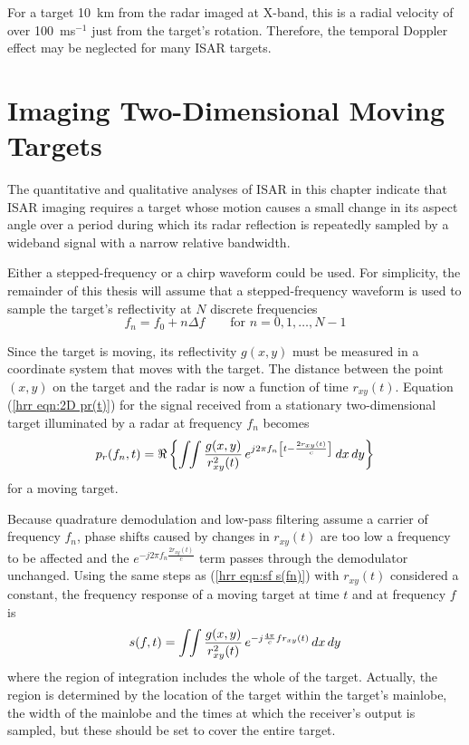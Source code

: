 For a target 10~km from the radar imaged at X-band, this is a radial
velocity of over 100~ms${}^{-1}$ just from the target's rotation.
Therefore, the temporal Doppler effect may be neglected for many ISAR
targets.

\section{Imaging Two-Dimensional Moving Targets}

The quantitative and qualitative analyses of ISAR in this chapter indicate
that ISAR imaging requires a target whose motion causes a small change in its
aspect angle over a period during which its radar reflection is repeatedly
sampled by a wideband signal with a narrow relative bandwidth.

Either a stepped-frequency or a chirp waveform could be used.  For
simplicity, the remainder of this thesis will assume that a
stepped-frequency waveform is used to sample the target's reflectivity at
$N$ discrete frequencies
\begin{equation}
f_n=f_0+n\Delta f\qquad\mbox{for $n=0,1,\ldots,N-1$}
\end{equation}

Since the target is moving, its reflectivity $g(x,y)$ must be measured
in a coordinate system that moves with the target.  The distance between the
point $(x,y)$ on the target and the radar is now a function of time
$r_{xy}(t)$.  Equation (\ref{hrr eqn:2D pr(t)}) for the signal received from
a stationary two-dimensional target illuminated by a radar at frequency
$f_n$ becomes
\begin{equation}
p_r(f_n,t)=\Re\left\{\int\!\!\int\frac{g(x,y)}{r_{xy}^2(t)}\,
e^{j2\pi f_n\left[t-\frac{2r_{xy}(t)}{c}\right]}\,dx\,dy\right\}
\end{equation}
for a moving target.

Because quadrature demodulation and low-pass filtering assume a carrier
of frequency $f_n$, phase shifts caused by changes in $r_{xy}(t)$ are
too low a frequency to be affected and the 
$e^{-j2\pi f_n\frac{2r_{xy}(t)}{c}}$ term passes through the demodulator
unchanged.  Using the same steps as (\ref{hrr eqn:sf s(fn)}) with
$r_{xy}(t)$ considered a constant, the frequency response of a moving
target at time $t$ and at frequency $f$ is
\begin{equation}\label{hrr eqn:s(f,t)}
s(f,t)=\int\!\!\int\frac{g(x,y)}{r_{xy}^2(t)}\,
e^{-j{\frac{4\pi}{c}} f r_{xy}(t)}\,dx\,dy
\end{equation}
where the region of integration includes the whole of the target.  Actually,
the region is determined by the location of the target within the target's 
mainlobe, the width of the mainlobe and the times at which the receiver's 
output is sampled, but these should be set to cover the entire target.

